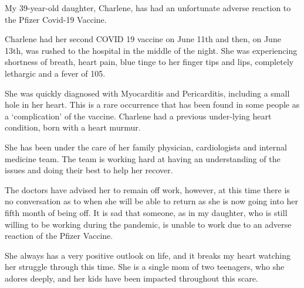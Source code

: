 My 39-year-old daughter, Charlene, has had an unfortunate adverse reaction to
the Pfizer Covid-19 Vaccine.

Charlene had her second COVID 19 vaccine on June 11th and then, on June 13th,
was rushed to the hospital in the middle of the night. She was experiencing
shortness of breath, heart pain, blue tinge to her finger tips and lips,
completely lethargic and a fever of 105.

She was quickly diagnosed with Myocarditis and Pericarditis, including a small
hole in her heart. This is a rare occurrence that has been found in some people
as a ‘complication’ of the vaccine. Charlene had a previous under-lying heart
condition, born with a heart murmur.

She has been under the care of her family physician, cardiologists and internal
medicine team. The team is working hard at having an understanding of the issues
and doing their best to help her recover.

The doctors have advised her to remain off work, however, at this time there is
no conversation as to when she will be able to return as she is now going into
her fifth month of being off. It is sad that someone, as in my daughter, who is
still willing to be working during the pandemic, is unable to work due to an
adverse reaction of the Pfizer Vaccine.

She always has a very positive outlook on life, and it breaks my heart watching
her struggle through this time. She is a single mom of two teenagers, who she
adores deeply, and her kids have been impacted throughout this scare.


